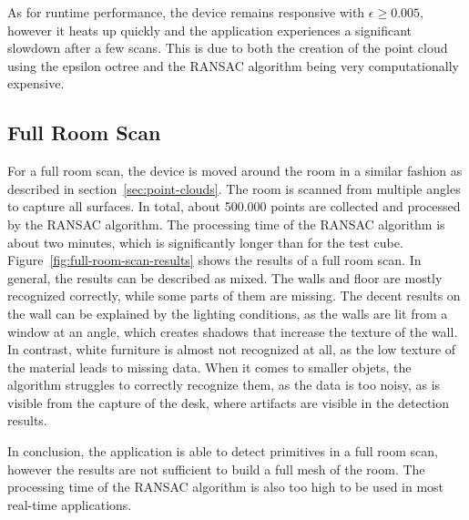 As for runtime performance, the device remains responsive with $\epsilon\geq0.005$, however it heats
up quickly and the application experiences a significant slowdown after a few scans.
This is due to both the creation of the point cloud using the epsilon octree and the RANSAC algorithm being
very computationally expensive.

\subsection{Full Room Scan}\label{subsec:application-performance-full-room}

For a full room scan, the device is moved around the room in a similar fashion as described in section~\ref{sec:point-clouds}.
The room is scanned from multiple angles to capture all surfaces.
In total, about 500.000 points are collected and processed by the RANSAC algorithm.
The processing time of the RANSAC algorithm is about two minutes, which is significantly longer than for the test cube.
Figure~\ref{fig:full-room-scan-results} shows the results of a full room scan.
In general, the results can be described as mixed.
The walls and floor are mostly recognized correctly, while some parts of them are missing.
The decent results on the wall can be explained by the lighting conditions, as the walls are lit from a window at an angle,
which creates shadows that increase the texture of the wall.
In contrast, white furniture is almost not recognized at all, as the low texture of the material leads
to missing data.
When it comes to smaller objets, the algorithm struggles to correctly recognize them, as the data is too noisy,
as is visible from the capture of the desk, where artifacts are visible in the detection results.

In conclusion, the application is able to detect primitives in a full room scan,
however the results are not sufficient to build a full mesh of the room.
The processing time of the RANSAC algorithm is also too high to be used in most real-time applications.


